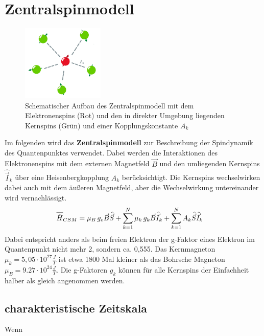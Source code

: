 \chapter{Zentralspinmodell}

\begin{figure}
    \centering
    \includegraphics[width = 0.35\textwidth]{Abbildungen/CSM_Schema_Salem.png}
    \caption{Schematischer Aufbau des Zentralspinmodell mit dem Elektronenspins (Rot) und den in direkter Umgebung liegenden 
    Kernspins (Grün) und einer Kopplungskonstante $A_k$}
    \label{fig:CSM}
\end{figure}
Im folgenden wird das \textbf{Zentralspinmodell} zur Beschreibung der Spindynamik des Quantenpunktes verwendet. Dabei werden die Interaktionen des 
Elektronenspins mit dem externen Magnetfeld $\vec{B}$ und den umliegenden Kernspins $\hat{\vec{I}}_k$ über eine Heisenbergkopplung $A_k$ berücksichtigt.
Die Kernspins wechselwirken dabei auch mit dem äußeren Magnetfeld, aber die Wechselwirkung untereinander wird vernachlässigt.
\begin{align}
    \overline{\hat{H}}_{CSM} &= \mu_B\thinspace g_e \vec{B}\hat{\vec{S}} +  \sum_{k=1}^{N}\mu_k\thinspace g_k\vec{B}\hat{\vec{I}}_k + \sum_{k=1}^{N} A_k \hat{\vec{S}}\hat{\vec{I}}_k
\end{align}
Dabei entspricht anders als beim freien Elektron der g-Faktor eines Elektron im Quantenpunkt nicht mehr 2, sondern ca. 0,555\cite{PMID:17901328}.
Das Kernmagneton $\mu_k= 5,05 \cdot 10^{27} \frac{J}{T}$ ist etwa 1800 Mal kleiner als das Bohrsche 
Magneton $\mu_B = 9.27 \cdot 10^{24} \frac{J}{T}$\cite{Dyakonov2008-ub}. Die g-Faktoren $g_k$ können für alle Kernspins der 
Einfachheit halber als gleich angenommen werden. \\

\section{charakteristische Zeitskala}
Wenn 




